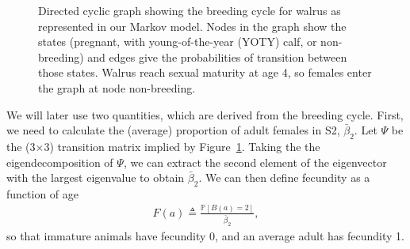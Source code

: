 \begin{figure}

\caption{Directed cyclic graph showing the breeding cycle for walrus as represented
in our Markov model. Nodes in the graph show the states (pregnant,
with young-of-the-year (YOTY) calf, or non-breeding) and edges give
the probabilities of transition between those states. Walrus reach
sexual maturity at age 4, so females enter the graph at node non-breeding.
\label{fig:Breeding-cycle}}
\end{figure}

We will later use two quantities, which are derived from the breeding
cycle. First, we need to calculate the (average) proportion of adult
females in S2, $\bar{\beta}_{2}$. Let $\Psi$ be the (3$\times$3)
transition matrix implied by Figure~\ref{fig:Breeding-cycle}. Taking
the the eigendecomposition of $\Psi$, we can extract the second element
of the eigenvector with the largest eigenvalue to obtain $\bar{\beta}_{2}$.
We can then define fecundity as a function of age
\begin{gather}
F\left(a\right)\triangleq\frac{\mathbb{P}\left[B\left(a\right)=2\right]}{\bar{\beta}_{2}},\label{eq:fec-def}
\end{gather}
so that immature animals have fecundity 0, and an average adult has
fecundity 1.

